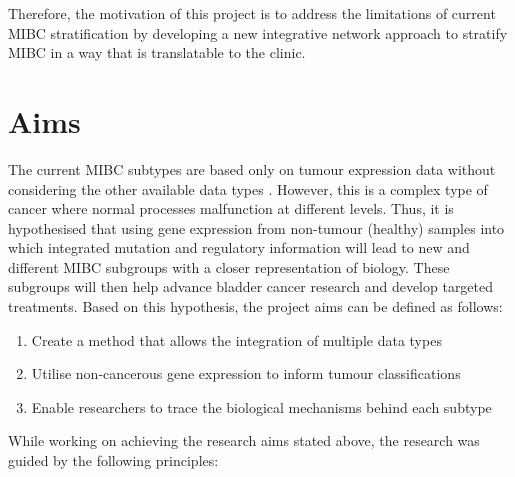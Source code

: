 Therefore, the motivation of this project is to address the limitations of current \gls{MIBC} stratification by developing a new integrative network approach to stratify \gls{MIBC} in a way that is translatable to the clinic.




\section{Aims} \label{s:intro:aims}



The current MIBC subtypes are based only on tumour expression data without considering the other available data types \citep{Kamoun2020-tj, Robertson2017-mg}. However, this is a complex type of cancer where normal processes malfunction at different levels. Thus, it is hypothesised that using gene expression from non-tumour (healthy) samples into which integrated mutation and regulatory information will lead to new and different MIBC subgroups with a closer representation of biology. These subgroups will then help advance bladder cancer research and develop targeted treatments. Based on this hypothesis, the project aims can be defined as follows:

\begin{enumerate}
    \item Create a method that allows the integration of multiple data types
    \item Utilise non-cancerous gene expression to inform tumour classifications
    \item Enable researchers to trace the biological mechanisms behind each subtype
\end{enumerate}

While working on achieving the research aims stated above, the research was guided by the following principles:

